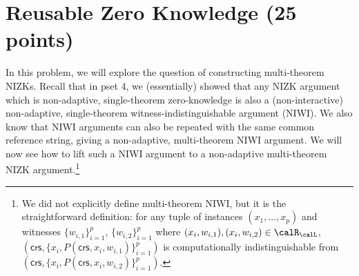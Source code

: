 \documentclass{article}
\newcommand{\crs}{\mathsf{crs}}
\begin{document}
\section{Reusable Zero Knowledge (25 points)}
In this problem, we will explore the question of constructing multi-theorem NIZKs. Recall that in pset 4, we (essentially) showed that any NIZK argument which is non-adaptive, single-theorem zero-knowledge is also a (non-interactive) non-adaptive, single-theorem witness-indistinguishable argument (NIWI). We also know that NIWI arguments can also be repeated with the same common reference string, giving a non-adaptive, multi-theorem NIWI argument. We will now see how to lift such a NIWI argument to a non-adaptive multi-theorem NIZK argument.\footnote{We did not explicitly define multi-theorem NIWI, but it is the straightforward definition: for any tuple of instances $(x_1, \ldots, x_p)$ and witnesses $\{w_{i, 1}\}_{i = 1}^p$, $\{w_{i, 2}\}_{i = 1}^p$ where $(x_i, w_{i, 1}), (x_i, w_{i, 2}) \in \calR_{\calL}$, $(\crs, \{x_i, P(\crs, x_i, w_{i, 1})\}_{i = 1}^p)$ is computationally indistinguishable from $(\crs, \{x_i, P(\crs, x_i, w_{i, 2})\}_{i = 1}^p)$.}
\end{document}
